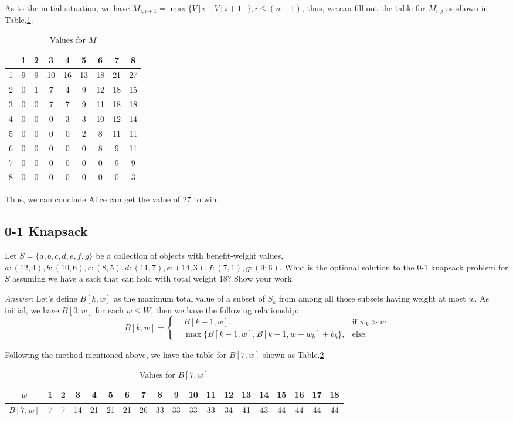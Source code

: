 \documentclass[11pt]{article}
\begin{document}
As to the initial situation, we have $M_{i,i+1}=\max\{V[i],V[i+1]\},i\leq(n-1)$, thus, we can fill out the table for $M_{i,j}$ as shown in Table.\ref{tab:tab1}.
\begin{table}[hbp]
	\centering
	\tiny
	\caption{Values for $M$}
	\begin{tabular}{c|c|c|c|c|c|c|c|c}
		\hline 
		\hline
		\diagbox{$i$}{$j$}	&1	&2	&3	&4	&5	&6	&7	&8	\\
		\hline
		1	&9	&9	&10	&16	&13	&18	&21	&27	\\
		\hline
		2	&0	&1	&7	&4	&9	&12	&18	&15	\\
		\hline
		3	&0	&0	&7	&7	&9	&11	&18	&18	\\
		\hline
		4	&0	&0	&0	&3	&3	&10	&12	&14	\\
		\hline
		5	&0	&0	&0	&0	&2	&8	&11	&11	\\
		\hline
		6	&0	&0	&0	&0	&0	&8	&9	&11	\\
		\hline
		7	&0	&0	&0	&0	&0	&0	&9	&9	\\
		\hline
		8	&0	&0	&0	&0	&0	&0	&0	&3	\\
		\hline
		\hline
	\end{tabular}
	\label{tab:tab1}
\end{table}

Thus, we can conclude Alice can get the value of $27$ to win.
\subsection{0-1 Knapsack}\label{NEED TO TRACEBACK}
Let $S=\{a,b,c,d,e,f,g\}$ be a collection of objects with benefit-weight values, $a:(12,4), b:(10,6), c:(8,5), d:(11,7), e:(14,3),f:(7,1), g:(9:6)$. What is the optional solution to the 0-1 knapsack problem for $S$ assuming we have a sack that can hold with total weight $18$? Show your work.

\noindent \emph{Answer}: Let's define $B[k,w]$ as the maximum total value of a subset of $S_k$ from among all those subsets having weight at most $w$. As initial, we have $B[0,w]$ for each $w\leq W$, then we have the following relationship:
$$
	B[k,w]=\left\{
		\begin{aligned}
		&B[k-1,w],& \text{if } w_k>w\\
		&\max\{B[k-1,w],B[k-1,w-w_k]+b_k\}, &\text{else}.
		\end{aligned}
	\right.
$$

Following the method mentioned above, we have the table for $B[7,w]$ shown as Table.\ref{tab:tab2}
\begin{table}[!hbp]
	\centering
	\tiny
	\caption{Values for $B[7,w]$}
	\begin{tabular}{c|c|c|c|c|c|c|c|c|c|c|c|c|c|c|c|c|c|c}
		\hline 
		\hline
		$w$	&1	&2	&3	&4	&5	&6	&7	&8	&9	&10	&11	&12	&13	&14	&15	&16	&17	&18\\
		\hline
	$B[7,w]$&7	&7	&14	&21	&21	&21	&26	&33	&33	&33	&33	&34	&41	&43	&44	&44	&44	&44\\
		\hline
		\hline
	\end{tabular}
	\label{tab:tab2}
\end{table}
\end{document}
